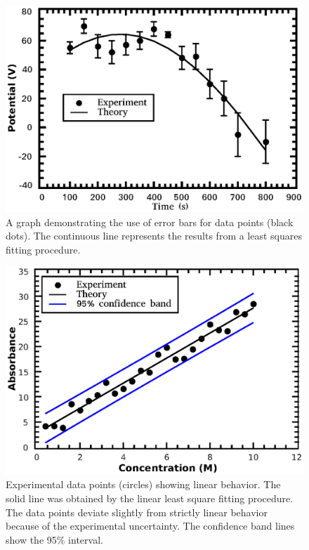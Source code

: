 \documentclass[byrevtex,amssymb,aps,pra,floatfix,letterpaper]{revtex4}
\begin{document}
\begin{figure}[!htp]
\begin{center}
\includegraphics[scale=0.5]{graph1}
\caption{A graph demonstrating the use of error bars for data points (black dots). The continuous
line represents the results from a least squares fitting procedure.}
\label{fig1}
\end{center}
\end{figure}

\begin{figure}[!htp]
\begin{center}
\includegraphics[scale=0.5]{graph2}
\caption{Experimental data points (circles) showing linear behavior. The solid line was obtained by the linear least square fitting procedure. The data points deviate slightly from strictly linear behavior because of the experimental uncertainty. The confidence band lines show the 95\% interval.}
\label{fig2}
\end{center}
\end{figure}
\end{document}
